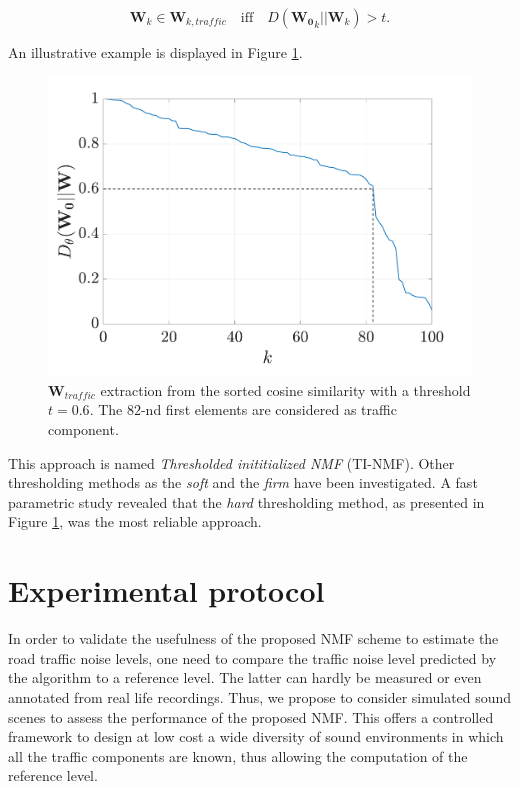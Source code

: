 \documentclass[twocolumn,a4paper,10pt]{article}
\begin{document}
\begin{equation}
\mathbf{W}_k \in \mathbf{W}_{k,traffic} \quad \text{iff} \quad D\left(\mathbf{W_0}_k \vert \vert \mathbf{W}_{k} \right) > t.
\end{equation}

An illustrative example is displayed in Figure \ref{fig:W_TI_NMF}.\\

\begin{figure}[hbtp]
\centering
\includegraphics[width=0.8\linewidth]{figures/distanceCosLinDisplay.pdf}
\caption{$\mathbf{W}_{traffic}$ extraction from the sorted cosine similarity with a threshold $t = 0.6$. The $82$-nd first elements are considered as traffic component.}
\label{fig:W_TI_NMF}
\end{figure}

This approach is named \textit{Thresholded inititialized NMF} (TI-NMF). Other thresholding methods as the \textit{soft} \cite{donoho1995noising} and the \textit{firm} \cite{fornasier2008iterative} have been investigated. A fast parametric study revealed that the \textit{hard} thresholding method, as presented in  Figure \ref{fig:W_TI_NMF}, was the most reliable approach.

\section{Experimental protocol}\label{part:protocol}

In order to validate the usefulness of the proposed NMF scheme to estimate the road traffic noise levels, one need to compare the traffic noise level predicted by the algorithm to a reference level. The latter can hardly be measured or even annotated from real life recordings. Thus,  we propose to consider simulated sound scenes to assess the performance of the proposed NMF. This offers a controlled framework to design at low cost a wide diversity of sound environments in which all the traffic components are known, thus allowing the computation of the reference level.
\end{document}
